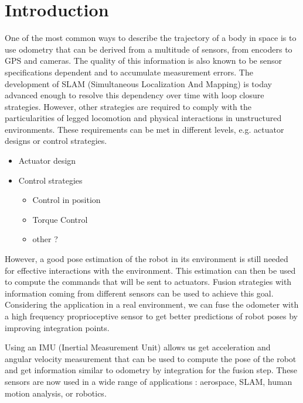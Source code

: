
\section{Introduction}\label{sec:intro}

One of the most common ways to describe the trajectory of a body in space is to use odometry that can be derived from a multitude of sensors, from encoders to GPS and cameras.
The quality of this information is also known to be sensor specifications dependent and to accumulate measurement errors. The development of SLAM (Simultaneous Localization And Mapping) is today advanced enough to resolve 
this dependency over time with loop closure strategies. However, other strategies are required to comply with the particularities of legged locomotion and physical interactions in unstructured environments. These requirements can be met in 
different levels, e.g. actuator designs or control strategies.

  \begin{itemize}
   \item Actuator design  \cite{wensing2017proprioceptive}
   \item Control strategies
    \begin{itemize}
     \item Control in position
     \item Torque Control
     \item other ?
    \end{itemize}
  \end{itemize}

However, a good pose estimation of the robot in its environment is still needed for effective interactions with the environment. This estimation can then be used to compute the commands that will be sent to actuators.
Fusion strategies with information coming from different sensors can be used to achieve this goal. Considering the application in a real environment, we can fuse the odometer with a high frequency proprioceptive sensor 
to get better predictions of robot poses by improving integration points.

Using an IMU (Inertial Measurement Unit) allows us get acceleration and angular velocity measurement that can be used to compute the pose of the robot and get information similar to odometry by integration for the fusion step.
These sensors are now used in a wide range of applications : aerospace, SLAM, human motion analysis, or robotics.


